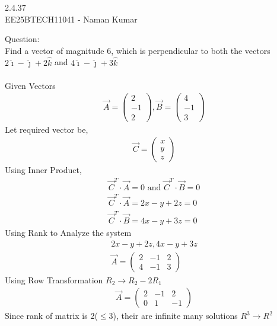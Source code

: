 \documentclass[journal]{IEEEtran}
\author{EE25BTECH11041-Naman Kumar }
\begin{document}
\begin{center}
    \huge{2.4.37}\\
    \large{EE25BTECH11041 - Naman Kumar}
\end{center}
Question:\\
Find a vector of magnitude 6, which is perpendicular to both the vectors $2\hat{\imath} - \hat{\jmath} + 2\hat{k}$ and $4\hat{\imath} - \hat{\jmath} + 3\hat{k}$\\
\solution \\
Given Vectors
\begin{align}
    \Vec{A}=\begin{pmatrix} 2\\-1\\2 \end{pmatrix}, \Vec{B}=\begin{pmatrix} 4\\-1\\3 \end{pmatrix}
\end{align}
Let required vector be,
\begin{align}
    \vec{C}=\begin{pmatrix} x\\y\\z \end{pmatrix}
\end{align}
Using Inner Product,
\begin{align}
    \vec{C}^T \cdot\vec{A}=0\text{ and }\vec{C}^T \cdot\vec{B}=0\\
    \vec{C}^T \cdot\vec{A}=2x-y+2z=0 \label{1} \\
    \vec{C}^T \cdot\vec{B}=4x-y+3z=0 \label{2}
\end{align}
Using Rank to Analyze the system
\begin{align}
    2x-y+2z,4x-y+3z\\
    \vec{A}=\begin{pmatrix} 2&-1&2\\4&-1&3 \end{pmatrix}
\end{align}
Using Row Transformation $R_2 \rightarrow R_2-2R_1$
\begin{align}
    \vec{A}=\begin{pmatrix} 2&-1&2\\0&1&-1 \end{pmatrix}
\end{align}
Since rank of matrix is 2($\leq 3$), their are infinite many solutions $R^3\rightarrow R^2$\\
\end{document}
